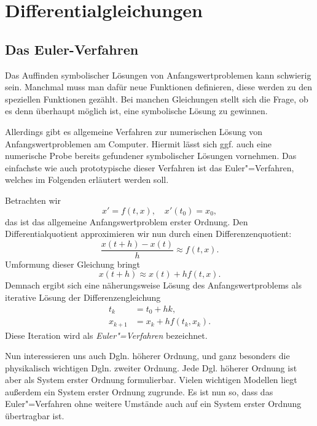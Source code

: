 
\chapter{Differentialgleichungen}

\section{Das Euler-Verfahren}

Das Auffinden symbolischer Lösungen von Anfangswertproblemen kann
schwierig sein. Manchmal muss man dafür neue Funktionen definieren,
diese werden zu den speziellen Funktionen gezählt. Bei manchen
Gleichungen stellt sich die Frage, ob es denn überhaupt möglich ist,
eine symbolische Lösung zu gewinnen.

Allerdings gibt es allgemeine Verfahren zur numerischen Lösung von
Anfangswertproblemen am Computer. Hiermit lässt sich ggf. auch eine
numerische Probe bereits gefundener symbolischer Lösungen vornehmen.
Das einfachste wie auch prototypische dieser Verfahren ist das
Euler"=Verfahren, welches im Folgenden erläutert werden soll.

Betrachten wir
\begin{equation}\label{eq:AWP-O1}
x' = f(t,x),\quad x'(t_0) = x_0,
\end{equation}
das ist das allgemeine Anfangswertproblem erster Ordnung. Den
Differentialquotient approximieren wir nun durch einen
Differenzenquotient:%
\begin{equation}
\frac{x(t+h)-x(t)}{h} \approx f(t,x).
\end{equation}
Umformung dieser Gleichung bringt
\begin{equation}\label{eq:x-step-approx}
x(t+h)\approx x(t)+hf(t,x).
\end{equation}
Demnach ergibt sich eine näherungsweise Lösung des Anfangswertproblems
als iterative Lösung der Differenzengleichung%
\begin{align}
t_{k} &= t_0+hk,\\
x_{k+1} &= x_k+hf(t_k,x_k).
\end{align}
Diese Iteration wird als \emph{Euler"=Verfahren} bezeichnet.

Nun interessieren uns auch Dgln. höherer Ordnung, und ganz besonders
die physikalisch wichtigen Dgln. zweiter Ordnung. Jede Dgl. höherer
Ordnung ist aber als System erster Ordnung formulierbar. Vielen
wichtigen Modellen liegt außerdem ein System erster Ordnung zugrunde.
Es ist nun so, dass das Euler"=Verfahren ohne weitere Umstände auch
auf ein System erster Ordnung übertragbar ist.

